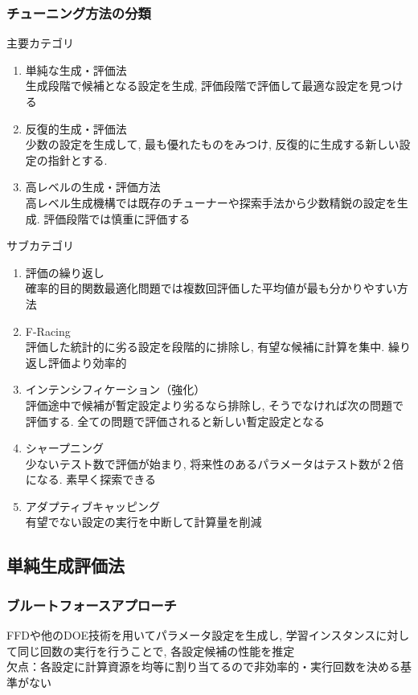 \documentclass[twocolumn]{jarticle}     %
\begin{document}
\subsubsection{チューニング方法の分類}

主要カテゴリ
\begin{enumerate}
  \item 単純な生成・評価法 \\
  生成段階で候補となる設定を生成, 評価段階で評価して最適な設定を見つける

  \item 反復的生成・評価法 \\
  少数の設定を生成して, 最も優れたものをみつけ, 反復的に生成する新しい設定の指針とする.

  \item 高レベルの生成・評価方法 \\
  高レベル生成機構では既存のチューナーや探索手法から少数精鋭の設定を生成.
  評価段階では慎重に評価する
\end{enumerate}

サブカテゴリ
\begin{enumerate}
  \item 評価の繰り返し \\
  確率的目的関数最適化問題では複数回評価した平均値が最も分かりやすい方法

  \item F-Racing \\
  評価した統計的に劣る設定を段階的に排除し, 有望な候補に計算を集中. 繰り返し評価より効率的

  \item インテンシフィケーション（強化） \\
  評価途中で候補が暫定設定より劣るなら排除し, そうでなければ次の問題で評価する. 全ての問題で評価されると新しい暫定設定となる

  \item シャープニング \\
  少ないテスト数で評価が始まり, 将来性のあるパラメータはテスト数が２倍になる. 素早く探索できる

  \item アダプティブキャッピング  \\
  有望でない設定の実行を中断して計算量を削減
\end{enumerate}

\subsection{単純生成評価法}
\subsubsection{ブルートフォースアプローチ}
FFDや他のDOE技術を用いてパラメータ設定を生成し, 学習インスタンスに対して同じ回数の実行を行うことで, 各設定候補の性能を推定\\
欠点：各設定に計算資源を均等に割り当てるので非効率的・実行回数を決める基準がない
\end{document}
